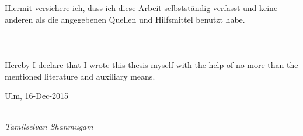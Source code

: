 \newpage

\addtocounter{page}{2}
\begin{large}

\vspace*{6cm}

\noindent
Hiermit versichere ich, dass ich diese Arbeit selbstst\"andig verfasst und keine anderen als die
angegebenen Quellen und Hilfsmittel benutzt habe.\\\\\\\\

Hereby I declare that I wrote this thesis myself with the help of no more than the mentioned literature and auxiliary means.
\vspace{2cm}

\noindent
Ulm, 16-Dec-2015

\vspace{1cm}

\hspace*{5cm}%
\dotfill\\
\hspace*{9.1cm}%
\textit{Tamilselvan Shanmugam}

\end{large}
